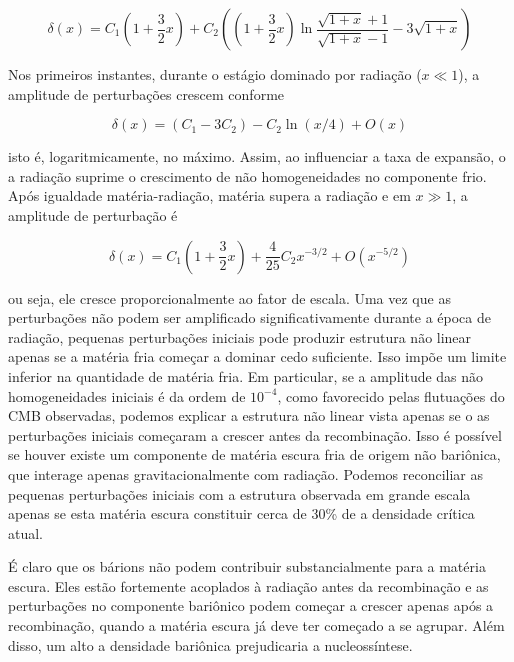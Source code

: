 \documentclass[a4paper,12pt]{article}
\begin{document}
\begin{equation}\label{eq72}
	\delta (x) = C_1 \left(1+\dfrac{3}{2}x\right) + C_2\left(\left(1+\dfrac{3}{2}x\right)\ln \dfrac{\sqrt{1+x}+1}{\sqrt{1+x}-1} - 3\sqrt{1+x}\right)
\end{equation}

Nos primeiros instantes, durante o estágio dominado por radiação ($x \ll 1$), a amplitude de perturbações crescem conforme

\begin{equation}\label{eq73}
	\delta (x) = (C_1 - 3C_2) -C_2 \ln (x/4) + O(x)
\end{equation}

isto é, logaritmicamente, no máximo. Assim, ao influenciar a taxa de expansão, o
a radiação suprime o crescimento de não homogeneidades no componente frio. Após
igualdade matéria-radiação, matéria supera a radiação e em $x \gg 1$, a amplitude
de perturbação é

\begin{equation}\label{eq74}
	\delta (x) = C_1 \left( 1 + \dfrac{3}{2}x\right) +\dfrac{4}{25}C_2x^{-3/2} + O(x^{-5/2})
\end{equation}

ou seja, ele cresce proporcionalmente ao fator de escala.
\newline
Uma vez que as perturbações não podem ser amplificado significativamente durante a época de radiação, pequenas perturbações iniciais pode produzir estrutura não linear apenas se a matéria fria começar a dominar cedo suficiente. Isso impõe um limite inferior na quantidade de matéria fria. Em particular, se a amplitude das não homogeneidades iniciais é da ordem de $10^{-4}$, como favorecido pelas
flutuações do CMB observadas, podemos explicar a estrutura não linear vista apenas se o as perturbações iniciais começaram a crescer antes da recombinação. Isso é possível se houver existe um componente de matéria escura fria de origem não bariônica, que interage apenas gravitacionalmente com radiação. Podemos reconciliar as pequenas perturbações iniciais com a estrutura observada em grande escala apenas se esta matéria escura constituir cerca de 30\% de
a densidade crítica atual.

É claro que os bárions não podem contribuir substancialmente para a matéria escura. Eles estão fortemente acoplados à radiação antes da recombinação e as perturbações no componente bariônico podem começar a crescer apenas após a recombinação, quando a matéria escura já deve ter começado a se agrupar. Além disso, um alto a densidade bariônica prejudicaria a nucleossíntese.
\end{document}
